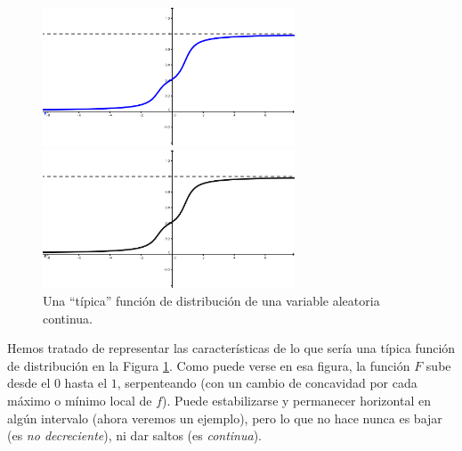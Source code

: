 \begin{figure}[h!]
\begin{center}
\begin{enColor}
\includegraphics[width=7.5cm]{../fig/Cap05-FuncionDistribucionVariableContinuaTipica.png}
\end{enColor}
\begin{bn}
\includegraphics[width=7.5cm]{../fig/Cap05-FuncionDistribucionVariableContinuaTipica-bn.png}
\end{bn}
\caption{Una ``típica'' función de distribución de una variable aleatoria continua.}
\label{cap05:fig:TipicaFuncionDistribucionVariableContinua}
\end{center}
\end{figure}
\noindent Hemos tratado de representar las características de lo que sería una típica función de
distribución en la Figura \ref{cap05:fig:TipicaFuncionDistribucionVariableContinua}. Como puede
verse en esa figura, la función $F$ sube desde el $0$ hasta el $1$, serpenteando (con un cambio de
concavidad por cada máximo o mínimo local de $f$). Puede estabilizarse y permanecer horizontal en
algún intervalo (ahora veremos un ejemplo), pero lo que no hace nunca es bajar (es {\em no
decreciente}), ni dar saltos (es {\em continua}).

